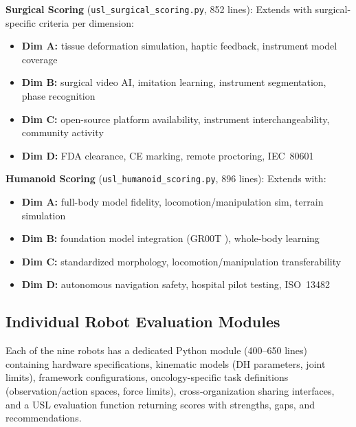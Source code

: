 \documentclass[11pt,a4paper]{article}
\begin{document}
\textbf{Surgical Scoring} (\texttt{usl\_surgical\_scoring.py}, 852 lines): Extends with surgical-specific criteria per dimension:
\begin{itemize}
  \item \textbf{Dim A:} tissue deformation simulation, haptic feedback, instrument model coverage
  \item \textbf{Dim B:} surgical video AI, imitation learning, instrument segmentation, phase recognition
  \item \textbf{Dim C:} open-source platform availability, instrument interchangeability, community activity
  \item \textbf{Dim D:} FDA clearance, CE marking, remote proctoring, IEC~80601 \cite{iec80601}
\end{itemize}

\textbf{Humanoid Scoring} (\texttt{usl\_humanoid\_scoring.py}, 896 lines): Extends with:
\begin{itemize}
  \item \textbf{Dim A:} full-body model fidelity, locomotion/manipulation sim, terrain simulation
  \item \textbf{Dim B:} foundation model integration (GR00T \cite{groot2026}), whole-body learning
  \item \textbf{Dim C:} standardized morphology, locomotion/manipulation transferability
  \item \textbf{Dim D:} autonomous navigation safety, hospital pilot testing, ISO~13482 \cite{iso13482}
\end{itemize}

\subsection{Individual Robot Evaluation Modules}
Each of the nine robots has a dedicated Python module (400--650 lines) containing hardware specifications, kinematic models (DH parameters, joint limits), framework configurations, oncology-specific task definitions (observation/action spaces, force limits), cross-organization sharing interfaces, and a USL evaluation function returning scores with strengths, gaps, and recommendations.

\end{document}
